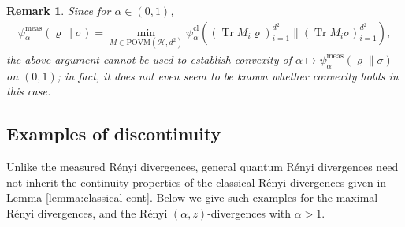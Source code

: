 \documentclass[unsortedaddress,superscriptaddress,pra,notitlepage]{revtex4}
\newtheorem{rem}[definition]{Remark}
\def\rho{\varrho}
\def\hil{{\mathcal H}}
\def\bz{\left(}
\def\jz{\right)}
\def\povm{\mathrm{POVM}}
\def\meas{\mathrm{meas}}
\def\cl{\mathrm{cl}}
\def\cl{\mathrm{cl}}
\DeclareMathOperator{\Tr}{Tr}
\begin{document}
\begin{rem}
Since for $\alpha\in(0,1)$, 
\begin{align*}
\psi_{\alpha}^{\meas}(\rho\|\sigma)
=
\min_{M\in\povm(\hil,d^2)}\psi_{\alpha}^{\cl}
\bz(\Tr M_i\rho)_{i=1}^{d^2}\big\|(\Tr M_i\sigma)_{i=1}^{d^2}\jz,
\end{align*}
the above argument cannot be used to establish convexity of 
$\alpha\mapsto \psi_{\alpha}^{\meas}(\rho\|\sigma)$ on $(0,1)$; in fact, it does not even seem to be known whether convexity holds in this case.
\end{rem}


\subsection{Examples of discontinuity}
\label{sec:discont}

Unlike the measured R\'enyi divergences, general quantum R\'enyi divergences need not inherit the continuity properties of the classical R\'enyi divergences given in Lemma \ref{lemma:classical cont}.
Below we give such examples for the 
maximal R\'enyi divergences, and the
R\'enyi $(\alpha,z)$-divergences with $\alpha>1$. 
\end{document}
